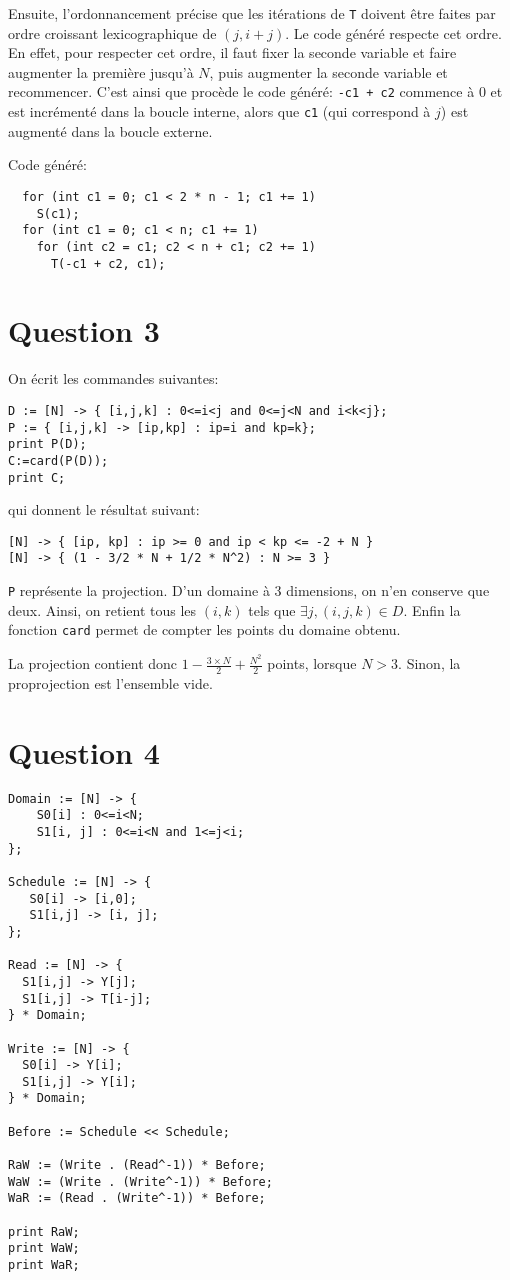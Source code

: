 \documentclass{article}
\begin{document}
Ensuite, l'ordonnancement précise que les itérations de \lstinline{T} doivent être faites par ordre croissant lexicographique de $(j,i+j)$.
Le code généré respecte cet ordre.
En effet, pour respecter cet ordre, il faut fixer la seconde variable et faire augmenter la première jusqu'à $N$, puis augmenter la seconde variable et recommencer.
C'est ainsi que procède le code généré: \lstinline{-c1 + c2} commence à 0 et est incrémenté dans la boucle interne, alors que \lstinline{c1} (qui correspond à $j$) est augmenté dans la boucle externe.

Code généré:
\begin{lstlisting}
  for (int c1 = 0; c1 < 2 * n - 1; c1 += 1)
    S(c1);
  for (int c1 = 0; c1 < n; c1 += 1)
    for (int c2 = c1; c2 < n + c1; c2 += 1)
      T(-c1 + c2, c1);
\end{lstlisting}

\section*{Question 3}

On écrit les commandes suivantes:
\begin{lstlisting}
D := [N] -> { [i,j,k] : 0<=i<j and 0<=j<N and i<k<j};
P := { [i,j,k] -> [ip,kp] : ip=i and kp=k};
print P(D);
C:=card(P(D));
print C;
\end{lstlisting}

qui donnent le résultat suivant:
\begin{lstlisting}
[N] -> { [ip, kp] : ip >= 0 and ip < kp <= -2 + N }
[N] -> { (1 - 3/2 * N + 1/2 * N^2) : N >= 3 }
\end{lstlisting}

\lstinline{P} représente la projection.
D'un domaine à 3 dimensions, on n'en conserve que deux.
Ainsi, on retient tous les $(i,k)$ tels que $\exists j, (i,j,k)\in D$.
Enfin la fonction \lstinline{card} permet de compter les points du domaine obtenu.

La projection contient donc $1-\frac{3\times N}{2} + \frac{N^2}{2}$ points, lorsque $N>3$. Sinon, la proprojection est l'ensemble vide.


\section*{Question 4}

\begin{lstlisting}
Domain := [N] -> {
    S0[i] : 0<=i<N;
    S1[i, j] : 0<=i<N and 1<=j<i;
};

Schedule := [N] -> {
   S0[i] -> [i,0];
   S1[i,j] -> [i, j];
};

Read := [N] -> {
  S1[i,j] -> Y[j];
  S1[i,j] -> T[i-j];
} * Domain;

Write := [N] -> {
  S0[i] -> Y[i];
  S1[i,j] -> Y[i];
} * Domain;

Before := Schedule << Schedule;

RaW := (Write . (Read^-1)) * Before;
WaW := (Write . (Write^-1)) * Before;
WaR := (Read . (Write^-1)) * Before;

print RaW;
print WaW;
print WaR;
\end{lstlisting}
\end{document}

